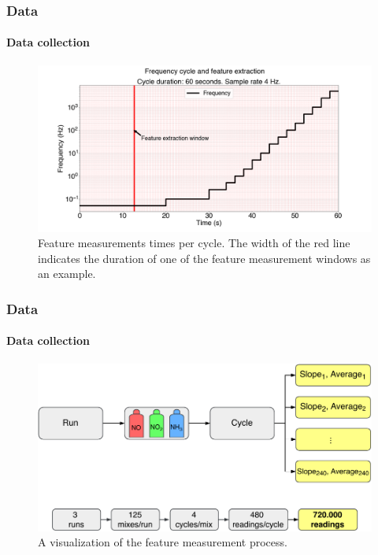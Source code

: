 \documentclass{beamer}
\begin{document}
\begin{frame}
	\frametitle{Data}
	\framesubtitle{Data collection}
	
	\begin{figure}[!htb]
		\centering
		\includegraphics[width=1\textwidth]{../../figures/measurement-windows.png}
		
		\caption{Feature measurements times per cycle. The width of the red line indicates the duration of one of the feature measurement windows as an example.}
		\label{fig:feat-window}
	\end{figure} 
\end{frame}

\begin{frame}
	\frametitle{Data}
	\framesubtitle{Data collection}
	
	\begin{figure}[h]
		\centering
		\includegraphics[width=1\textwidth]{../../figures/features.pdf}
		\caption{A visualization of the feature measurement process.}
		\label{fig:features}
	\end{figure}
\end{frame}
\end{document}
